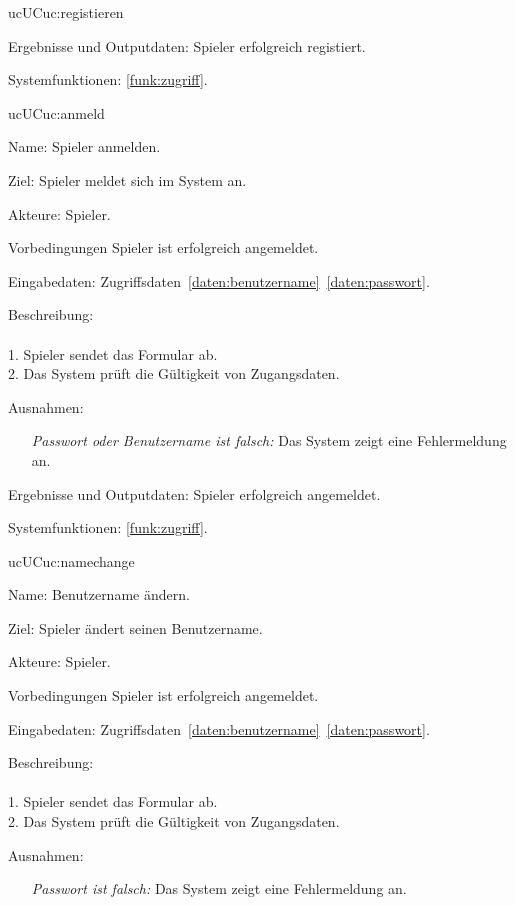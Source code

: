 \begin{description}[leftmargin=5em, style=sameline]
\begin{lhp}{uc}{UC}{uc:registieren}
\begin{itemize}
	\end{itemize}
	\item [Ergebnisse und Outputdaten:] Spieler erfolgreich registiert.	
	\item [Systemfunktionen:] \ref{funk:zugriff}.
    \end{lhp}
	
	\begin{lhp}{uc}{UC}{uc:anmeld}
		\item [Name:] Spieler anmelden.
		\item [Ziel:] Spieler meldet sich im System an.
		\item [Akteure:] Spieler.
		\item [Vorbedingungen] Spieler ist erfolgreich angemeldet.
		\item [Eingabedaten:] Zugriffsdaten~\ref{daten:benutzername}~\ref{daten:passwort}.
		\item [Beschreibung:] \hfill\\ \hfill\\
			1. Spieler sendet das Formular ab.\\
			2. Das System prüft die Gültigkeit von Zugangsdaten.\\				
		\item [Ausnahmen:]\hfill 
	    	\begin{itemize} 
			    \item[] \textit{Passwort oder Benutzername ist falsch:} Das System zeigt eine Fehlermeldung an.					
			
		    \end{itemize}
		\item [Ergebnisse und Outputdaten:] Spieler erfolgreich angemeldet.	
		\item [Systemfunktionen:] \ref{funk:zugriff}.
	\end{lhp}
	
	\begin{lhp}{uc}{UC}{uc:namechange}
		\item [Name:] Benutzername ändern.
		\item [Ziel:] Spieler ändert seinen Benutzername.
		\item [Akteure:] Spieler.
		\item [Vorbedingungen] Spieler ist erfolgreich angemeldet.
		\item [Eingabedaten:] Zugriffsdaten~\ref{daten:benutzername}~\ref{daten:passwort}.
		\item [Beschreibung:] \hfill\\ \hfill\\
			1. Spieler sendet das Formular ab.\\
			2. Das System prüft die Gültigkeit von Zugangsdaten.\\				
		\item [Ausnahmen:]\hfill 
	    	\begin{itemize} 
			    \item[] \textit{Passwort ist falsch:} Das System zeigt eine Fehlermeldung an.					
			

\end{itemize}
\end{lhp}
\end{description}
